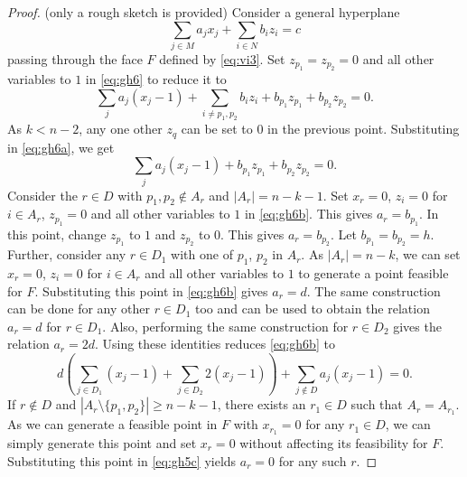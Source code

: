 \documentclass[12pt]{article}
\newcommand{\lp}{\left(}
\newcommand{\rp}{\right)}
\newcommand{\sm}{\setminus}
\begin{document}
\begin{proof} (only a rough sketch is provided) Consider a general hyperplane 
\begin{equation}
\sum_{j \in M} a_j x_j + \sum_{i \in N} b_i z_i = c
\label{eq:gh6}
\end{equation}
passing through the face $F$ defined by \eqref{eq:vi3}. Set $z_{p_1} = z_{p_2} = 0$ and all other variables to $1$ in \eqref{eq:gh6} to reduce it to
\begin{equation}
\sum_{j} a_j (x_j - 1) + \sum_{i \neq p_1,p_2} b_i z_i + b_{p_1} z_{p_1} + b_{p_2} z_{p_2} = 0.
\label{eq:gh6a}
\end{equation}
As $k < n-2$, any one other $z_q$ can be set to $0$ in the previous point. Substituting in \eqref{eq:gh6a}, we get
\begin{equation}
\sum_{j} a_j (x_j - 1) + b_{p_1} z_{p_1} + b_{p_2} z_{p_2} = 0.
\label{eq:gh6b}
\end{equation}
Consider the $r \in D$ with $p_1,p_2 \notin A_r$ and $|A_r| = n-k-1$. Set $x_r = 0$, $z_i = 0$ for $i \in A_r$, $z_{p_1} = 0$ and all other variables to $1$ in \eqref{eq:gh6b}. This gives $a_r = b_{p_1}$. In this point, change $z_{p_1}$ to $1$ and $z_{p_2}$ to $0$. This gives $a_r = b_{p_2}$. Let $b_{p_1} = b_{p_2} = h$. Further, consider any $r \in D_1$ with one of $p_1$, $p_2$ in $A_r$. As $|A_r| = n-k$, we can set $x_r = 0$, $z_i = 0$ for $i \in A_r$ and all other variables to $1$ to generate a point feasible for $F$. Substituting this point in \eqref{eq:gh6b} gives $a_r = d$. The same construction can be done for any other $r \in D_1$ too and can be used to obtain the relation $a_r = d$ for $r \in D_1$. Also, performing the same construction for $r \in D_2$ gives the relation $a_r = 2d$. Using these identities reduces \eqref{eq:gh6b} to
\begin{equation}
d \lp \sum_{j \in D_1} (x_j - 1) + \sum_{j \in D_2} 2(x_j - 1) \rp +  \sum_{j \notin D} a_j (x_j - 1) = 0.
\label{eq:gh6c}
\end{equation}
If $r \notin D$ and $|A_r \sm \{p_1,p_2\}| \geq n-k-1$, there exists an $r_1 \in D$ such that $A_r = A_{r_1}$. As we can generate a feasible point in $F$ with $x_{r_1} = 0$ for any $r_1 \in D$, we can simply generate this point and set $x_r = 0$ without affecting its feasibility for $F$. Substituting this point in \eqref{eq:gh5c} yields $a_r = 0$ for any such $r$.


\end{proof}
\end{document}
